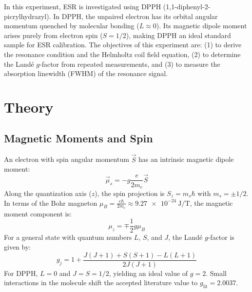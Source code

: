 \documentclass[journal]{IEEEtran}
\begin{document}
In this experiment, ESR is investigated using DPPH (1,1-diphenyl-2-picrylhydrazyl). In DPPH, the unpaired electron has its orbital angular momentum quenched by molecular bonding ($L \approx 0$). Its magnetic dipole moment arises purely from electron spin ($S = 1/2$), making DPPH an ideal standard sample for ESR calibration. The objectives of this experiment are: (1) to derive the resonance condition and the Helmholtz coil field equation, (2) to determine the Land\'e $g$-factor from repeated measurements, and (3) to measure the absorption linewidth (FWHM) of the resonance signal.

\section{Theory}

\subsection{Magnetic Moments and Spin}
An electron with spin angular momentum $\vec{S}$ has an intrinsic magnetic dipole moment:
\begin{equation}
    \vec{\mu}_s = -g \frac{e}{2 m_e} \vec{S}
    \label{eq:mu_spin}
\end{equation}
Along the quantization axis ($z$), the spin projection is $S_z = m_s \hbar$ with $m_s = \pm 1/2$. In terms of the Bohr magneton $\mu_B = \frac{e \hbar}{2 m_e} \approx \SI{9.27e-24}{\joule\per\tesla}$, the magnetic moment component is:
\begin{equation}
    \mu_z = \mp \frac{1}{2} g \mu_B
    \label{eq:mu_z_spin}
\end{equation}
For a general state with quantum numbers $L$, $S$, and $J$, the Land\'e $g$-factor is given by:
\begin{equation}
    g_j = 1 + \frac{J(J+1) + S(S+1) - L(L+1)}{2 J(J+1)}
    \label{eq:lande_general}
\end{equation}
For DPPH, $L = 0$ and $J = S = 1/2$, yielding an ideal value of $g = 2$. Small interactions in the molecule shift the accepted literature value to $g_{\text{lit}} = 2.0037$.
\end{document}
